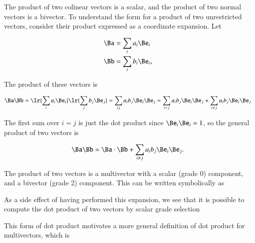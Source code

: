 %
%
The product of two colinear vectors is a scalar, and the product of two normal vectors is a bivector.
To understand the form for a product of two unrestricted vectors, consider their product expressed as a coordinate expansion.  Let

\begin{dmath}\label{eqn:SimpleProducts2:1160}
\begin{aligned}
\Ba &= \sum_i a_i \Be_i \\
\Bb &= \sum_i b_i \Be_i,
\end{aligned}
\end{dmath}

The product of these vectors is

\begin{dmath}\label{eqn:SimpleProducts2:1360}
\Ba \Bb
=
\lr{ \sum_i a_i \Be_i } \lr{ \sum_j b_j \Be_j }
=
\sum_{ij} a_i b_j \Be_i \Be_j
=
\sum_{i = j} a_i b_j \Be_i \Be_j
+
\sum_{i \ne j} a_i b_j \Be_i \Be_j
\end{dmath}

The first sum over \( i = j \) is just the dot product since \( \Be_i \Be_i = 1 \), so the general product of two vectors is

\begin{dmath}\label{eqn:SimpleProducts2:1480}
\Ba \Bb
=
\Ba \cdot \Bb
+
\sum_{i \ne j} a_i b_j \Be_i \Be_j.
\end{dmath}

The product of two vectors is a multivector with a scalar (grade 0) component, and a bivector (grade 2) component.  This can be written symbolically as


As a side effect of having performed this expansion, we see that it is possible to compute the dot product of two vectors by scalar grade selection


This form of dot product motivates a more general definition of dot product for multivectors, which is


